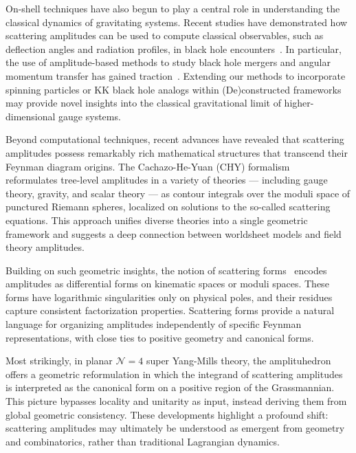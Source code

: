 \documentclass[12pt]{article}
\numberwithin{equation}{section}
\begin{document}
On-shell techniques have also begun to play a central role in understanding the classical dynamics of gravitating systems. Recent studies have demonstrated how scattering amplitudes can be used to compute classical observables, such as deflection angles and radiation profiles, in black hole encounters~\cite{Guevara:2019fsj,Neill:2013wsa}. In particular, the use of amplitude-based methods to study black hole mergers and angular momentum transfer has gained traction~\cite{Aoki:2024boe}. Extending our methods to incorporate spinning particles or KK black hole analogs within (De)constructed frameworks may provide novel insights into the classical gravitational limit of higher-dimensional gauge systems.

Beyond computational techniques, recent advances have revealed that scattering amplitudes possess remarkably rich mathematical structures that transcend their Feynman diagram origins. The Cachazo-He-Yuan (CHY) formalism~\cite{Cachazo:2013gna}~\cite{Cachazo:2013hca}~\cite{Cachazo:2013iea} reformulates tree-level amplitudes in a variety of theories — including gauge theory, gravity, and scalar theory — as contour integrals over the moduli space of punctured Riemann spheres, localized on solutions to the so-called scattering equations. This approach unifies diverse theories into a single geometric framework and suggests a deep connection between worldsheet models and field theory amplitudes.

Building on such geometric insights, the notion of scattering forms~\cite{Arkani-Hamed:2017mur} encodes amplitudes as differential forms on kinematic spaces or moduli spaces. These forms have logarithmic singularities only on physical poles, and their residues capture consistent factorization properties. Scattering forms provide a natural language for organizing amplitudes independently of specific Feynman representations, with close ties to positive geometry and canonical forms.

Most strikingly, in planar \( \mathcal{N}=4 \) super Yang-Mills theory, the amplituhedron offers a geometric reformulation in which the integrand of scattering amplitudes is interpreted as the canonical form on a positive region of the Grassmannian. This picture bypasses locality and unitarity as input, instead deriving them from global geometric consistency. These developments highlight a profound shift: scattering amplitudes may ultimately be understood as emergent from geometry and combinatorics, rather than traditional Lagrangian dynamics.
\end{document}
